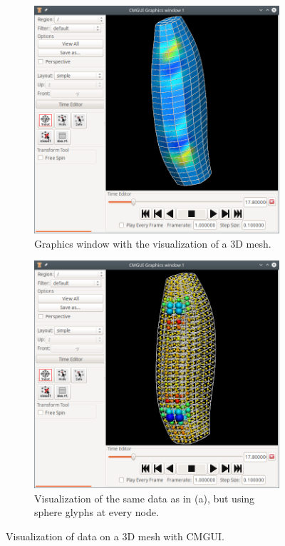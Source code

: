 \begin{figure}%
  \centering%
  \begin{subfigure}[t]{0.48\textwidth}%
    \centering%
    \includegraphics[width=\textwidth]{images/implementation/cmgui_emg.png}%
    \caption{Graphics window with the visualization of a 3D mesh.}%
    \label{fig:cmgui_emg}%
  \end{subfigure}
  \begin{subfigure}[t]{0.48\textwidth}%
    \centering%
    \includegraphics[width=\textwidth]{images/implementation/cmgui_phie.png}
    \caption{Visualization of the same data as in (a), but using sphere glyphs at every node.}%
    \label{fig:cmgui_phie}%
  \end{subfigure}
  \caption{Visualization of data on a 3D mesh with CMGUI.}%
  \label{fig:cmgui_output2}%
\end{figure}%

